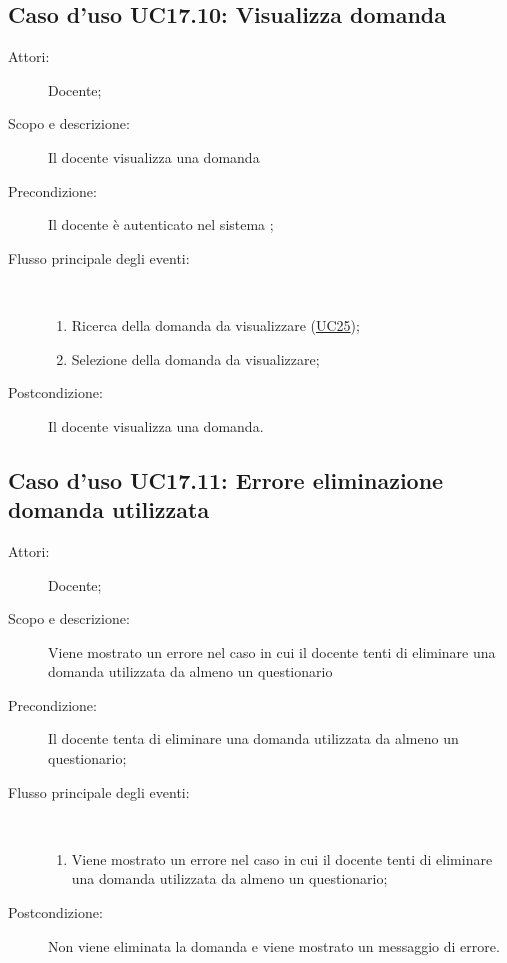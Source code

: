 \subsection{Caso d'uso UC17.10: Visualizza domanda}\begin{description}
	\item[Attori:] Docente;
	\item[Scopo e descrizione:] Il docente visualizza una domanda
	\item[Precondizione:] Il docente è autenticato nel sistema
	;
	
	\item[Flusso principale degli eventi:] \ 
	\begin{enumerate}
		\item Ricerca della domanda da visualizzare (\hyperlink{UC25}{UC25});
		\item Selezione della domanda da visualizzare;
		
	\end{enumerate}
	\item[Postcondizione:] Il docente visualizza una domanda.
\end{description}
\hypertarget{UC17.11}{}
\subsection{Caso d'uso UC17.11: Errore eliminazione domanda utilizzata}\begin{description}
	\item[Attori:] Docente;
	\item[Scopo e descrizione:] Viene mostrato un errore nel caso in cui il docente tenti di eliminare una domanda utilizzata da almeno un questionario
	\item[Precondizione:] Il docente tenta di eliminare una domanda utilizzata da almeno un questionario;
	
	\item[Flusso principale degli eventi:] \ 
	\begin{enumerate}
		\item Viene mostrato un errore nel caso in cui il docente tenti di eliminare una domanda utilizzata da almeno un questionario;
		
	\end{enumerate}
	\item[Postcondizione:] Non viene eliminata la domanda e viene mostrato un messaggio di errore.
\end{description}
\hypertarget{UC18}{}

